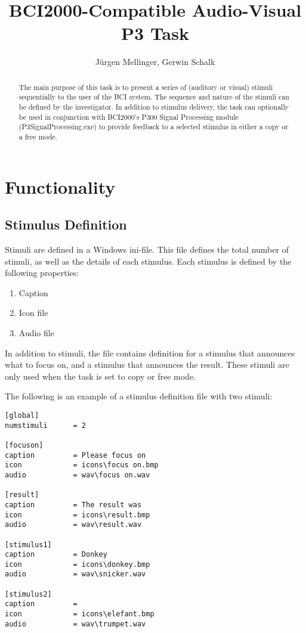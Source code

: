 \documentclass[letterpaper,oneside,12pt]{article}
\begin{document}
%
\title{BCI2000-Compatible Audio-Visual P3 Task}
\author{J\"{u}rgen Mellinger, Gerwin Schalk}
\maketitle

\tableofcontents

\newpage 

\begin{abstract}

The main purpose of this task is to present a series of (auditory or visual) 
stimuli sequentially to the user of the BCI system. The sequence and nature of 
the stimuli can be defined by the investigator. In addition to stimulus 
delivery, the task can optionally be used in conjunction with BCI2000's P300 
Signal Processing module (P3SignalProcessing.exe) to provide feedback to a 
selected stimulus in either a copy or a free mode.

\end{abstract}

\section{Functionality}

\subsection{Stimulus Definition}

Stimuli are defined in a Windows\texttrademark{} ini-file. This file defines the 
total number of stimuli, as well as the details of each stimulus. Each 
stimulus is defined by the following properties:
\begin{enumerate}
 \item Caption
 \item Icon file
 \item Audio file
\end{enumerate}

In addition to stimuli, the file contains definition for a stimulus that 
announces what to focus on, and a stimulus that announces the result. These
stimuli are only used when the task is set to copy or free mode.

The following is an example of a stimulus definition file with two stimuli:
\begin{verbatim}
[global]
numstimuli      = 2

[focuson]
caption         = Please focus on
icon            = icons\focus on.bmp
audio           = wav\focus on.wav

[result]
caption         = The result was
icon            = icons\result.bmp
audio           = wav\result.wav

[stimulus1]
caption         = Donkey
icon            = icons\donkey.bmp
audio           = wav\snicker.wav

[stimulus2]
caption         =
icon            = icons\elefant.bmp
audio           = wav\trumpet.wav
\end{verbatim}
\end{document}
